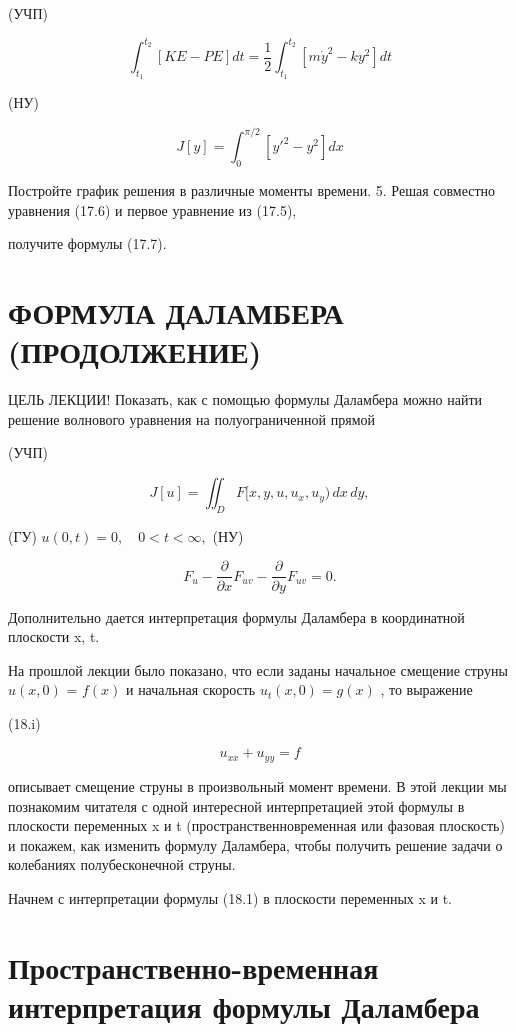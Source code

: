 \documentclass[
  ukrainian,
]{article}
\begin{document}
(УЧП)

\[
\int_{t_{1}}^{t_{2}} [KE - PE] dt = \frac{1}{2} \int_{t_{1}}^{t_{2}} [m\dot{y}^{2} - ky^{2}] dt
\]

(НУ)

\[
J[y] = \int_{0}^{\pi/2} [y'^{2} - y^{2}] dx
\]

Постройте график решения в различные моменты времени. 5. Решая совместно
уравнения (17.6) и первое уравнение из (17.5),

получите формулы (17.7).

\section{ФОРМУЛА ДАЛАМБЕРА
(ПРОДОЛЖЕНИЕ)}\label{ux444ux43eux440ux43cux443ux43bux430-ux434ux430ux43bux430ux43cux431ux435ux440ux430-ux43fux440ux43eux434ux43eux43bux436ux435ux43dux438ux435}

ЦЕЛЬ ЛЕКЦИИ! Показать, как с помощью формулы Даламбера можно найти
решение волнового уравнения на полуограниченной прямой

(УЧП)

\[
J[u] = \iint_D F[x, y, u, u_x, u_y) \, dx \, dy,
\]

(ГУ) \(u(0, t) = 0, \quad 0 < t < \infty,\) (НУ)

\[
F_{u} - \frac{\partial}{\partial x} F_{uv} - \frac{\partial}{\partial y} F_{uv} = 0.
\]

Дополнительно дается интерпретация формулы Даламбера в координатной
плоскости x, t.

На прошлой лекции было показано, что если заданы начальное смещение
струны \(u(x, 0)\) = \(f(x)\) и начальная скорость \(u_t(x, 0) = g(x)\)
, то выражение

(18.i)

\[
u_{xx} + u_{yy} = f
\]

описывает смещение струны в произвольный момент времени. В этой лекции
мы познакомим читателя с одной интересной интерпретацией этой формулы в
плоскости переменных x и t (пространственновременная или фазовая
плоскость) и покажем, как изменить формулу Даламбера, чтобы получить
решение задачи о колебаниях полубесконечной струны.

Начнем с интерпретации формулы (18.1) в плоскости переменных x и t.

\section{Пространственно-временная интерпретация формулы
Даламбера}\label{ux43fux440ux43eux441ux442ux440ux430ux43dux441ux442ux432ux435ux43dux43dux43e-ux432ux440ux435ux43cux435ux43dux43dux430ux44f-ux438ux43dux442ux435ux440ux43fux440ux435ux442ux430ux446ux438ux44f-ux444ux43eux440ux43cux443ux43bux44b-ux434ux430ux43bux430ux43cux431ux435ux440ux430}
\end{document}
